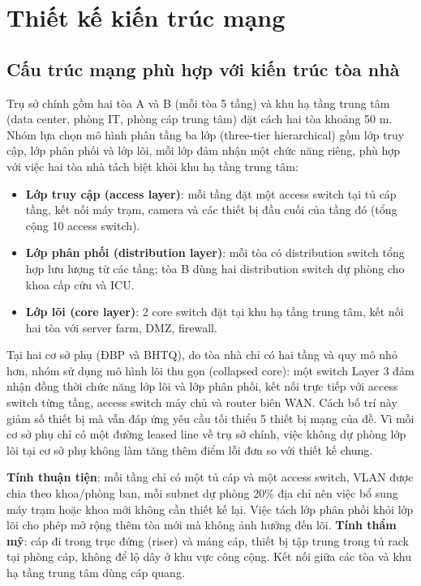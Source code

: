 \section{Thiết kế kiến trúc mạng}

\subsection{Cấu trúc mạng phù hợp với kiến trúc tòa nhà}
Trụ sở chính gồm hai tòa A và B (mỗi tòa 5 tầng) và khu hạ tầng trung tâm (data center, phòng IT, phòng cáp trung tâm) đặt cách hai tòa khoảng 50 m. Nhóm lựa chọn mô hình phân tầng ba lớp (three-tier hierarchical) gồm lớp truy cập, lớp phân phối và lớp lõi, mỗi lớp đảm nhận một chức năng riêng, phù hợp với việc hai tòa nhà tách biệt khỏi khu hạ tầng trung tâm:
\begin{itemize}
    \item \textbf{Lớp truy cập (access layer)}: mỗi tầng đặt một access switch tại tủ cáp tầng, kết nối máy trạm, camera và các thiết bị đầu cuối của tầng đó (tổng cộng 10 access switch).
    \item \textbf{Lớp phân phối (distribution layer)}: mỗi tòa có distribution switch tổng hợp lưu lượng từ các tầng; tòa B dùng hai distribution switch dự phòng cho khoa cấp cứu và ICU.
    \item \textbf{Lớp lõi (core layer)}: 2 core switch đặt tại khu hạ tầng trung tâm, kết nối hai tòa với server farm, DMZ, firewall.
\end{itemize}

Tại hai cơ sở phụ (ĐBP và BHTQ), do tòa nhà chỉ có hai tầng và quy mô nhỏ hơn, nhóm sử dụng mô hình lõi thu gọn (collapsed core): một switch Layer 3 đảm nhận đồng thời chức năng lớp lõi và lớp phân phối, kết nối trực tiếp với access switch từng tầng, access switch máy chủ và router biên WAN. Cách bố trí này giảm số thiết bị mà vẫn đáp ứng yêu cầu tối thiểu 5 thiết bị mạng của đề. Vì mỗi cơ sở phụ chỉ có một đường leased line về trụ sở chính, việc không dự phòng lớp lõi tại cơ sở phụ không làm tăng thêm điểm lỗi đơn so với thiết kế chung.

\textbf{Tính thuận tiện}: mỗi tầng chỉ có một tủ cáp và một access switch, VLAN được chia theo khoa/phòng ban, mỗi subnet dự phòng 20\% địa chỉ nên việc bổ sung máy trạm hoặc khoa mới không cần thiết kế lại. Việc tách lớp phân phối khỏi lớp lõi cho phép mở rộng thêm tòa mới mà không ảnh hưởng đến lõi. \textbf{Tính thẩm mỹ}: cáp đi trong trục đứng (riser) và máng cáp, thiết bị tập trung trong tủ rack tại phòng cáp, không để lộ dây ở khu vực công cộng. Kết nối giữa các tòa và khu hạ tầng trung tâm dùng cáp quang.

